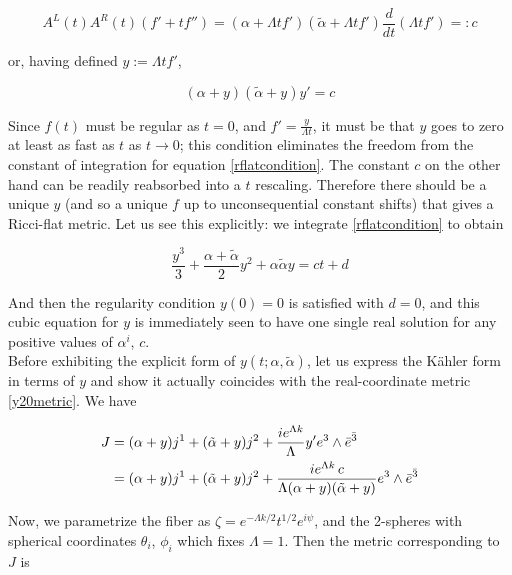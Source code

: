 \begin{equation}
	A^L(t)A^R(t)(f'+tf'') = (\alpha + \Lambda t f')(\tilde{\alpha} + \Lambda t f') \frac{d}{dt} (\Lambda t f') =: c \label{rflatcondition}
\end{equation}

or, having defined $y := \Lambda t f'$,

\begin{equation}
	(\alpha + y)(\tilde{\alpha} + y) y' = c
\end{equation}

Since $f(t)$ must be regular as $t=0$, and $f' = \frac{y}{\Lambda t}$, it must be that $y$ goes to zero at least as fast as $t$ as $t\rightarrow 0$; this condition eliminates the freedom from the constant of integration for equation \ref{rflatcondition}. The constant $c$ on the other hand can be readily reabsorbed into a $t$ rescaling. Therefore there should be a unique $y$ (and so a unique $f$ up to unconsequential constant shifts) that gives a Ricci-flat metric. Let us see this explicitly: we integrate \ref{rflatcondition} to obtain

\begin{equation}
	\frac{y^3}{3} + \frac{\alpha + \tilde{\alpha}}{2} y^2 + \alpha \tilde{\alpha} y = ct + d \label{rflatintegrated}
\end{equation}

And then the regularity condition $y(0)=0$ is satisfied with $d=0$, and this cubic equation for $y$ is immediately seen to have one single real solution for any positive values of $\alpha^i$, $c$.\\

Before exhibiting the explicit form of $y(t;\alpha,\tilde\alpha)$, let us express the K\"ahler form in terms of $y$ and show it actually coincides with the real-coordinate metric \ref{y20metric}. We have

\begin{align}
	\label{Jintermsofy}
	J & =  (\alpha + y) j^1 + (\tilde{\alpha} + y) j^2 + \frac{ie^{\Lambda k}}\Lambda y' e^3 \wedge \bar e^{\bar 3}\\
	  & =  (\alpha + y) j^1 + (\tilde{\alpha} + y) j^2 + \frac{ie^{\Lambda k} \,c}{\Lambda (\alpha + y)(\tilde{\alpha} + y)} e^3 \wedge \bar e^{\bar 3}
\end{align}

Now, we parametrize the fiber as $\zeta = e^{-\Lambda k/2} t^{1/2} e^{i\psi}$, and the 2-spheres with spherical coordinates $\theta_i$, $\phi_i$ which fixes $\Lambda = 1$. Then the metric corresponding to $J$ is

